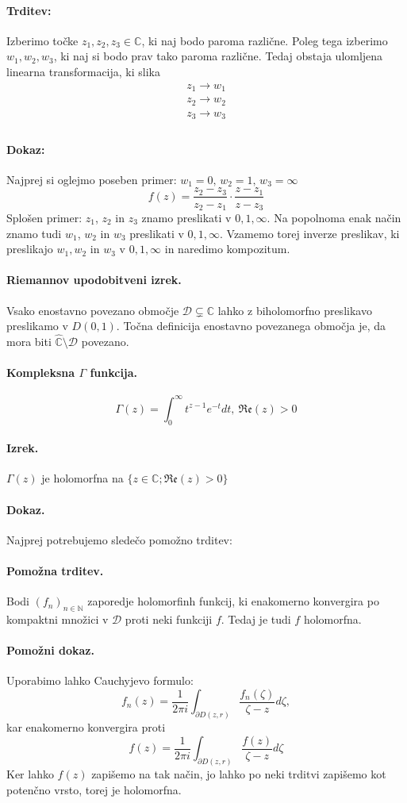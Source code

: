 \documentclass[a4paper]{article}
\newcommand{\C}{\mathbb{C}}
\newcommand{\N}{\mathbb{N}}
\begin{document}
\paragraph{Trditev:} Izberimo točke $z_1, z_2, z_3 \in \C$, ki naj bodo paroma različne. Poleg tega izberimo $w_1, w_2, w_3$, ki naj si bodo prav tako paroma različne. Tedaj obstaja ulomljena linearna transformacija, ki slika 
\begin{align*}
    z_1 \to w_1 \\
    z_2 \to w_2 \\
    z_3 \to w_3 \\
\end{align*}
\paragraph{Dokaz:} Najprej si oglejmo poseben primer: $w_1 = 0,\,w_2 = 1,\,w_3 = \infty$
$$f(z) = \frac{z_2 - z_3}{z_2 - z_1} \cdot \frac{z - z_1}{z - z_3}$$
Splošen primer: $z_1$, $z_2$ in $z_3$ znamo preslikati v $0, 1, \infty$. Na popolnoma enak način znamo tudi $w_1$, $w_2$ in $w_3$ preslikati v $0, 1, \infty$. Vzamemo torej inverze preslikav, ki preslikajo $w_1, w_2$ in $w_3$ v $0, 1, \infty$ in naredimo kompozitum.
\paragraph{Riemannov upodobitveni izrek.} Vsako enostavno povezano območje $\mathcal{D}\subsetneq\C$ lahko z biholomorfno preslikavo preslikamo v $D(0, 1)$. Točna definicija enostavno povezanega območja je, da mora biti $\hat{\C} \setminus \mathcal{D}$ povezano.
\paragraph{Kompleksna $\Gamma$ funkcija.}
$$\Gamma(z) = \int_{0}^{\infty} t^{z-1}e^{-t}dt,~\mathfrak{Re}(z)>0$$
\paragraph{Izrek.} $\Gamma (z)$ je holomorfna na $\{z\in\C;\mathfrak{Re}(z)>0\}$
\paragraph{Dokaz.} Najprej potrebujemo sledečo pomožno trditev:
\paragraph{Pomožna trditev.} Bodi $(f_n)_{n\in\N}$ zaporedje holomorfinh funkcij, ki enakomerno konvergira po kompaktni množici v $\mathcal{D}$ proti neki funkciji $f$. Tedaj je tudi $f$ holomorfna.
\paragraph{Pomožni dokaz.}Uporabimo lahko Cauchyjevo formulo: $$f_n(z) = \frac{1}{2\pi i} \int_{\partial D(z, r)} \frac{f_n(\zeta)}{\zeta - z}d\zeta,$$
kar enakomerno konvergira proti $$f(z) = \frac{1}{2\pi i} \int_{\partial D(z, r)} \frac{f(z)}{\zeta - z} d\zeta$$
Ker lahko $f(z)$ zapišemo na tak način, jo lahko po neki trditvi zapišemo kot potenčno vrsto, torej je holomorfna.
\end{document}
